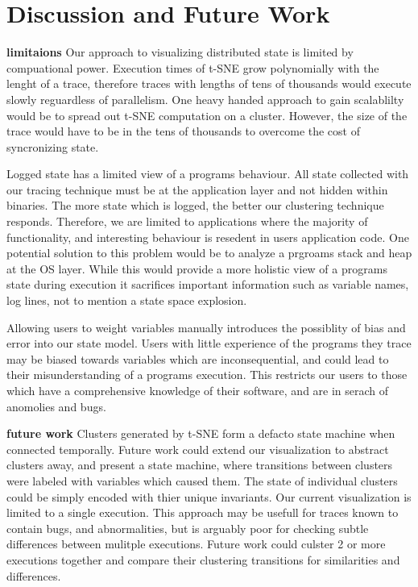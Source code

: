 \section{Discussion and Future Work}
\label{sec:dafw}

\noindent\textbf{limitaions}
            Our approach to visualizing distributed state is limited
            by compuational power. Execution times of t-SNE grow
            polynomially with the lenght of a trace, therefore traces
            with lengths of tens of thousands would execute slowly
            reguardless of parallelism. One heavy handed approach to
            gain scalablilty would be to spread out t-SNE computation
            on a cluster. However, the size of the trace would have to
            be in the tens of thousands to overcome the cost of
            syncronizing state.

            Logged state has a limited view of a programs behaviour.
            All state collected with our tracing technique must be at
            the application layer and not hidden within binaries. The
            more state which is logged, the better our clustering
            technique responds. Therefore, we are limited to
            applications where the majority of functionality, and
            interesting behaviour is resedent in users application
            code. One potential solution to this problem would be to
            analyze a prgroams stack and heap at the OS layer. While
            this would provide a more holistic view of a programs
            state during execution it sacrifices important information
            such as variable names, log lines, not to mention a state
            space explosion.

            Allowing users to weight variables manually introduces the
            possiblity of bias and error into our state model. Users
            with little experience of the programs they trace may be
            biased towards variables which are inconsequential, and
            could lead to their misunderstanding of a programs
            execution. This restricts our users to those which have a
            comprehensive knowledge of their software, and are in
            serach of anomolies and bugs.

\noindent\textbf{future work}
            Clusters generated by t-SNE form a defacto state machine
            when connected temporally. Future work could extend our
            visualization to abstract clusters away, and present a
            state machine, where transitions between clusters were
            labeled with variables which caused them. The state of
            individual clusters could be simply encoded with thier
            unique invariants.
            Our current visualization is limited to a single
            execution. This approach may be usefull for traces known
            to contain bugs, and abnormalities, but is arguably poor
            for checking subtle differences between mulitple
            executions. Future work could culster 2 or more executions
            together and compare their clustering transitions for
            similarities and differences. 
